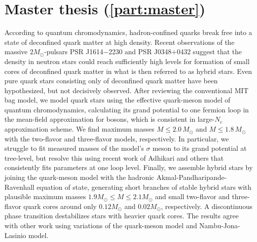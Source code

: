 \section*{Master thesis (\cref{part:master})}

According to quantum chromodynamics,
hadron-confined quarks break free into a state of deconfined quark matter at high density.
Recent observations of the massive $2 M_\odot$-pulsars PSR J1614$-$2230 and PSR J0348$+$0432
suggest that the density in neutron stars could reach sufficiently high levels
for formation of small cores of deconfined quark matter in what is then referred to as hybrid stars.
Even pure quark stars consisting only of deconfined quark matter have been hypothesized, but not decisively observed.
After reviewing the conventional MIT bag model,
we model quark stars using the effective quark-meson model of quantum chromodynamics,
calculating its grand potential to one fermion loop in the mean-field approximation for bosons,
which is consistent in large-$N_c$ approximation scheme.
We find maximum masses $M \leq 2.0 \, M_\odot$ and $M \leq 1.8 \, M_\odot$ with the two-flavor and three-flavor models, respectively.
In particular, we struggle to fit measured masses 
of the model's $\sigma$ meson to its grand potential at tree-level,
but resolve this using recent work of Adhikari and others that consistently fits parameters at one loop level.
Finally, we assemble hybrid stars by joining the quark-meson model with the hadronic Akmal-Pandharipande-Ravenhall equation of state,
generating short branches of stable hybrid stars with plausible maximum masses $1.9 M_\odot \leq M \leq 2.1 M_\odot$
and small two-flavor and three-flavor quark cores around only $0.12 M_\odot$ and $0.02 M_\odot$, respectively.
A discontinuous phase transition destabilizes stars with heavier quark cores.
The results agree with other work using variations of the quark-meson model and Nambu-Jona-Lasinio model.
